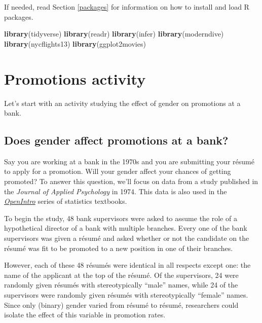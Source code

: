 \documentclass[
]{book}
\newenvironment{Shaded}{\begin{snugshade}}{\end{snugshade}}
\newcommand{\KeywordTok}[1]{\textcolor[rgb]{0.13,0.29,0.53}{\textbf{#1}}}
\newcommand{\NormalTok}[1]{#1}
\begin{document}
If needed, read Section \ref{packages} for information on how to install and load R packages.

\begin{Shaded}
\begin{Highlighting}[]
\KeywordTok{library}\NormalTok{(tidyverse)}
\KeywordTok{library}\NormalTok{(readr)}
\KeywordTok{library}\NormalTok{(infer)}
\KeywordTok{library}\NormalTok{(moderndive)}
\KeywordTok{library}\NormalTok{(nycflights13)}
\KeywordTok{library}\NormalTok{(ggplot2movies)}
\end{Highlighting}
\end{Shaded}

\hypertarget{ht-activity}{%
\section{Promotions activity}\label{ht-activity}}

Let's start with an activity studying the effect of gender on promotions at a bank.

\hypertarget{does-gender-affect-promotions-at-a-bank}{%
\subsection{Does gender affect promotions at a bank?}\label{does-gender-affect-promotions-at-a-bank}}

Say you are working at a bank in the 1970s and you are submitting your résumé to apply for a promotion. Will your gender affect your chances of getting promoted? To answer this question, we'll focus on data from a study published in the \emph{Journal of Applied Psychology} in 1974. This data is also used in the \href{https://www.openintro.org/}{\emph{OpenIntro}} series of statistics textbooks.

To begin the study, 48 bank supervisors were asked to assume the role of a hypothetical director of a bank with multiple branches. Every one of the bank supervisors was given a résumé and asked whether or not the candidate on the résumé was fit to be promoted to a new position in one of their branches.

However, each of these 48 résumés were identical in all respects except one: the name of the applicant at the top of the résumé. Of the supervisors, 24 were randomly given résumés with stereotypically ``male'' names, while 24 of the supervisors were randomly given résumés with stereotypically ``female'' names. Since only (binary) gender varied from résumé to résumé, researchers could isolate the effect of this variable in promotion rates.
\end{document}
